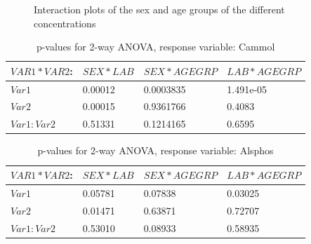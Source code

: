 \documentclass{article}
\begin{document}
\begin{figure}[H]
          \caption{Interaction plots of the sex and age groups of the different concentrations}
          \label{fig:IntAgeSex}
      \end{figure}
      

    \begin{table}[H]
    \begin{center}
    \scriptsize
    \begin{tabular}{|l|l|l|l|}
      \hline
      $VAR1 * VAR2$:&$SEX * LAB$&$SEX * AGEGRP$&$LAB*AGEGRP$\\
      \hline
      $Var1$       & 0.00012 & 0.0003835 & 1.491e-05\\
      $Var2$       & 0.00015 & 0.9361766 & 0.4083\\
      $Var1:Var2$  & 0.51331 & 0.1214165 & 0.6595\\
      \hline
    \end{tabular}
    \caption{p-values for 2-way ANOVA, response variable: Cammol}
    \label{table:AnCammol}
    \end{center}
    \end{table}

    \begin{table}[H]
    \begin{center}
    \scriptsize
    \begin{tabular}{|l|l|l|l|}
      \hline
      $VAR1 * VAR2$:&$SEX * LAB$&$SEX * AGEGRP$&$LAB*AGEGRP$\\
      \hline
      $Var1$       & 0.05781 & 0.07838 & 0.03025\\
      $Var2$       & 0.01471 & 0.63871 & 0.72707\\
      $Var1:Var2$  & 0.53010 & 0.08933 & 0.58935\\
      \hline
    \end{tabular}
    \caption{p-values for 2-way ANOVA, response variable: Alsphos}
    \label{table:AnAlsphos}
    \end{center}
    \end{table}
\end{document}
